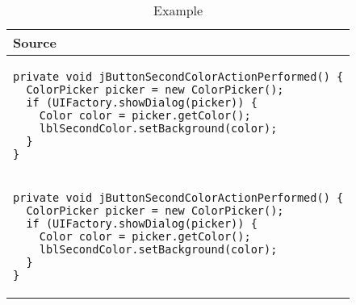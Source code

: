 \begin{table}[p]
\begin{tabular}{ | m{11cm} | }
  \hline
  Source \\
  \hline
  \begin{lstlisting}
private void jButtonSecondColorActionPerformed() {
  ColorPicker picker = new ColorPicker();
  if (UIFactory.showDialog(picker)) {
    Color color = picker.getColor();
    lblSecondColor.setBackground(color);
  }
}
  \end{lstlisting} \\
  \begin{lstlisting}
private void jButtonSecondColorActionPerformed() {
  ColorPicker picker = new ColorPicker();
  if (UIFactory.showDialog(picker)) {
    Color color = picker.getColor();
    lblSecondColor.setBackground(color);
  }
}
  \end{lstlisting} \\
  \hline
\end{tabular}
\caption{Example}
\label{uncorrupted_table}
\end{table}
